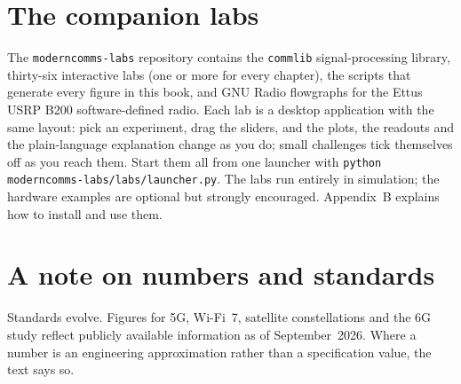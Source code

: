 \section*{The companion labs}
The \texttt{moderncomms-labs} repository contains the \texttt{commlib} signal-processing
library, thirty-six interactive labs (one or more for every chapter), the scripts that generate every
figure in this book, and GNU Radio flowgraphs for the Ettus USRP B200 software-defined
radio. Each lab is a desktop application with the same layout: pick an experiment, drag the
sliders, and the plots, the readouts and the plain-language explanation change as you do;
small challenges tick themselves off as you reach them. Start them all from one launcher with
\texttt{python moderncomms-labs/labs/launcher.py}. The labs run entirely in simulation; the
hardware examples are optional but strongly encouraged. Appendix~B explains how to install
and use them.

\section*{A note on numbers and standards}
Standards evolve. Figures for 5G, Wi-Fi~7, satellite constellations and the 6G study
reflect publicly available information as of September~2026. Where a number is an
engineering approximation rather than a specification value, the text says so.
